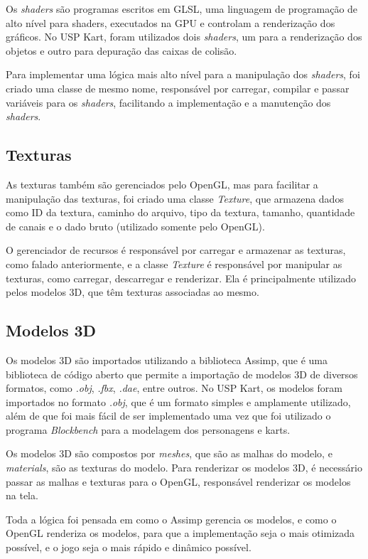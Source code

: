 Os \textit{shaders} são programas escritos em GLSL, uma linguagem de programação de alto nível para shaders, executados na GPU e controlam a renderização dos gráficos. No USP Kart, foram utilizados dois \textit{shaders}, um para a renderização dos objetos e outro para depuração das caixas de colisão.

Para implementar uma lógica mais alto nível para a manipulação dos \textit{shaders}, foi criado uma classe de mesmo nome, responsável por carregar, compilar e passar variáveis para os \textit{shaders}, facilitando a implementação e a manutenção dos \textit{shaders}.

\subsection{Texturas}

As texturas também são gerenciados pelo OpenGL, mas para facilitar a manipulação das texturas, foi criado uma classe \textit{Texture}, que armazena dados como ID da textura, caminho do arquivo, tipo da textura, tamanho, quantidade de canais e o dado bruto (utilizado somente pelo OpenGL).

O gerenciador de recursos é responsável por carregar e armazenar as texturas, como falado anteriormente, e a classe \textit{Texture} é responsável por manipular as texturas, como carregar, descarregar e renderizar. Ela é principalmente utilizado pelos modelos 3D, que têm texturas associadas ao mesmo.


\subsection{Modelos 3D}

Os modelos 3D são importados utilizando a biblioteca Assimp, que é uma biblioteca de código aberto que permite a importação de modelos 3D de diversos formatos, como \textit{.obj}, \textit{.fbx}, \textit{.dae}, entre outros. No USP Kart, os modelos foram importados no formato \textit{.obj}, que é um formato simples e amplamente utilizado, além de que foi mais fácil de ser implementado uma vez que foi utilizado o programa \textit{Blockbench} para a modelagem dos personagens e karts.

Os modelos 3D são compostos por \textit{meshes}, que são as malhas do modelo, e \textit{materials}, são as texturas do modelo. Para renderizar os modelos 3D, é necessário passar as malhas e texturas para o OpenGL, responsável renderizar os modelos na tela.

Toda a lógica foi pensada em como o Assimp gerencia os modelos, e como o OpenGL renderiza os modelos, para que a implementação seja o mais otimizada possível, e o jogo seja o mais rápido e dinâmico possível.

